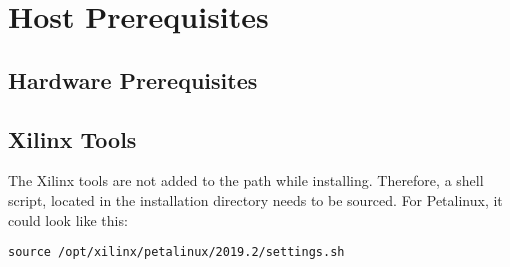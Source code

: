\section{Host Prerequisites}
\label{sec:embedded_platform:host_prerequisites}

\subsection{Hardware Prerequisites}
\label{subsec:embedded_platform:host_prerequisites:hardware_prerequisites}

\subsection{Xilinx Tools}
\label{subsec:embedded_platform:host_prerequisites:xilinx_tools}
The Xilinx tools are not added to the path while installing.
Therefore, a shell script, located in the installation directory needs to be sourced.
For Petalinux, it could look like this:
\begin{lstlisting}[style=bash, caption={}, label=lst:]
  source /opt/xilinx/petalinux/2019.2/settings.sh
\end{lstlisting}
